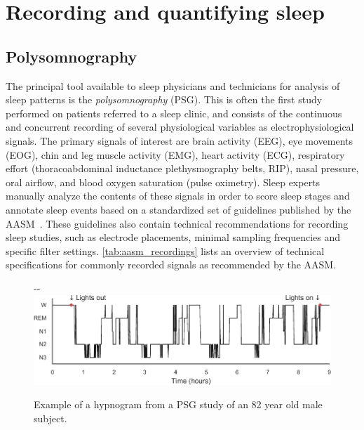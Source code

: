                 
    \section{Recording and quantifying sleep}\label{sec:recording-quantifying-sleep}
    
        \subsection{Polysomnography}\label{sec:polysomnography}
            The principal tool available to sleep physicians and technicians for analysis of sleep patterns is the \textit{polysomnography} (\acs{PSG}).
            This is often the first study performed on patients referred to a sleep clinic, and consists of the continuous and concurrent recording of several physiological variables as electrophysiological signals.
            The primary signals of interest are brain activity (\ac{EEG}), eye movements (\ac{EOG}), chin and leg muscle activity (\ac{EMG}), heart activity (\ac{ECG}), respiratory effort (thoracoabdominal inductance plethysmography belts, RIP), nasal pressure, oral airflow, and blood oxygen saturation (pulse oximetry).
            Sleep experts manually analyze the contents of these signals in order to score sleep stages and annotate sleep events based on a standardized set of guidelines published by the \ac{AASM}~\cite{Berry2020}. 
            These guidelines also contain technical recommendations for recording sleep studies, such as electrode placements, minimal sampling frequencies and specific filter settings. \cref{tab:aasm_recordings} lists an overview of technical specifications for commonly recorded signals as recommended by the \ac{AASM}.
            
            \begin{figure}
            \begin{adjustwidth*}{}{-\marginparwidth-\marginparsep}
                \includegraphics[width=\textwidth+\marginparwidth+\marginparsep]{figures/clinical-background/hypnogram.pdf}
                \caption[Hypnogram example of male subject]{Example of a hypnogram from a \acs{PSG} study of an 82 year old male subject.}
                \label{fig:clinical-background_hypnogram}
            \end{adjustwidth*}
            \end{figure}
            

